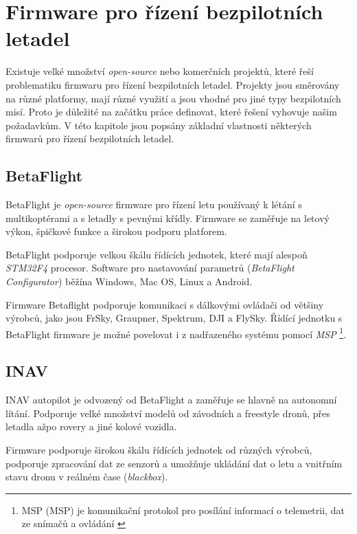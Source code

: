 \chapter{Firmware pro řízení bezpilotních letadel}

Existuje velké množství \textit{open-source} nebo komerčních projektů, které řeší problematiku firmwaru pro řízení bezpilotních letadel. Projekty jsou směrovány na různé platformy, mají různé využití a jsou vhodné pro jiné typy bezpilotních misí. Proto je důležité na začátku práce definovat, které řešení vyhovuje našim požadavkům. \break V této kapitole jsou popsány základní vlastnosti některých firmwarů pro řízení bezpilotních letadel.

\section{BetaFlight}

BetaFlight je \textit{open-source} firmware pro řízení letu používaný k létání s multikoptérami a s letadly s pevnými křídly. Firmware se zaměřuje na letový výkon, špičkové funkce a širokou podporu platforem.

BetaFlight podporuje velkou škálu řídících jednotek, které mají alespoň \textit{STM32F4} procesor. Software pro nastavování parametrů (\textit{BetaFlight Configurator}) běží\break na Windows, Mac OS, Linux a Android.

Firmware Betaflight podporuje komunikaci s dálkovými ovládači od většiny výrobců, jako jsou FrSky, Graupner, Spektrum, DJI a FlySky. Řídící jednotku s BetaFlight firmware je možné povelovat i z nadřazeného systému pomocí \textit{\acs{MSP}} \footnote{\acs{MSP} (\acl{MSP}) je komunikační protokol pro posílání informací o telemetrii, dat ze snímačů a ovládání \cite{ARDU}}. \cite{BetaF}

\section{INAV}

INAV autopilot je odvozený od BetaFlight a zaměřuje se hlavně na autonomní lítání. Podporuje velké množství modelů od závodních a freestyle dronů, přes letadla až\break po rovery a jiné kolové vozidla.

Firmware podporuje širokou škálu řídících jednotek od různých výrobců, podporuje zpracování dat ze senzorů a umožňuje ukládání dat o letu a vnitřním stavu dronu v reálném čase (\textit{blackbox}). \cite{INAV}

